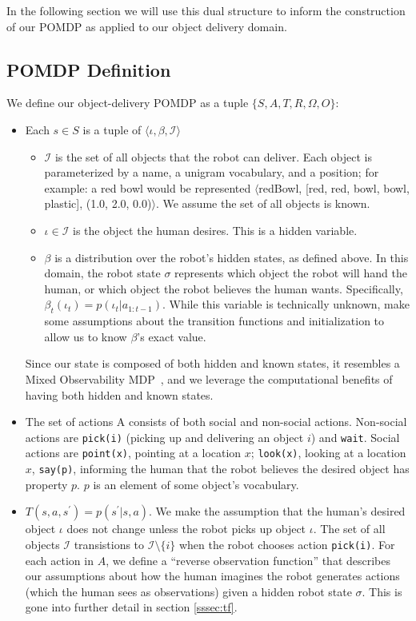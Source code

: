 \documentclass{article}
\newcommand{\Iota}{\mathcal{I}}
\begin{document}
\begin{multicols}{2}
In the following section we will use this dual structure to inform the construction of our POMDP as applied to our object delivery domain. 


\subsection{POMDP Definition}

We define our object-delivery POMDP as a tuple $\{S, A, T, R, \Omega, O\}$: 

\begin{itemize}
	\item Each $s \in S$ is a tuple of $\langle \iota, \beta, \Iota \rangle$		\begin{itemize}
			\item $\Iota$ is the set of all objects that the robot can deliver. Each object is parameterized by a name, a unigram vocabulary, and a position; for example: a red bowl would be represented $\langle$redBowl, [red, red, bowl, bowl, plastic], (1.0, 2.0, 0.0)$\rangle$. We assume the set of all objects is known. 
			\item $\iota \in \Iota$ is the object the human desires. This is a hidden variable. 
			\item $\beta$ is a distribution over the robot's hidden states, as defined above. In this domain, the robot state $\sigma$ represents which object the robot will hand the human, or which object the robot believes the human wants. Specifically, $\beta_t(\iota_t) = p(\iota_t | a_{1:t-1})$. While this variable is technically unknown, make some assumptions about the transition functions and initialization to allow us to know $\beta$'s exact value. 
		\end{itemize}
		Since our state is composed of both hidden and known states, it resembles a Mixed Observability MDP~\citep{momdp}, and we leverage the computational benefits of having both hidden and known states. 
	\item The set of actions A consists of both social and non-social actions. Non-social actions are \texttt{pick(i)} (picking up  and delivering an object $i$) and \texttt{wait}. Social actions are \texttt{point(x)}, pointing at a location $x$; \texttt{look(x)}, looking at a location $x$, \texttt{say(p)}, informing the human that the robot believes the desired object has property $p$. $p$ is an element of some object's vocabulary. 
	\item $T(s, a, s^\prime) = p(s^\prime | s, a)$. We make the assumption that the human's desired object $\iota$ does not change unless the robot picks up object $\iota$. The set of all objects $\Iota$ transistions to $\Iota \setminus \{i\}$ when the robot chooses action \texttt{pick(i)}. For each action in $A$, we define a ``reverse observation function'' that describes our assumptions about how the human imagines the robot generates actions (which the human sees as observations) given a hidden robot state $\sigma$. This is gone into further detail in section  \ref{sssec:tf}. 

\end{itemize}
\end{multicols}
\end{document}
